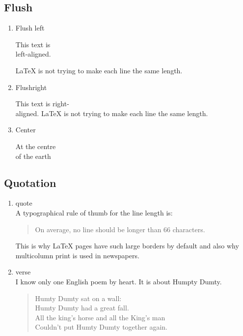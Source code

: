 \documentclass[12pt]{article}
\begin{document}
\subsection{Flush}
\begin{enumerate}
\item Flush left
  \begin{flushleft}
    This text is\\ left-aligned.

    \LaTeX{} is not trying to make each line the same length.
  \end{flushleft}
\item Flushright
  \begin{flushright}
    This text is right-\\aligned.
    \LaTeX{} is not trying to make each line the same length.
  \end{flushright}
\item{Center}
  \begin{center}
    At the centre\\of the earth
  \end{center}
\end{enumerate}
\subsection{Quotation}
\begin{enumerate}
\item quote\\
  A typographical rule of thumb for the line length is:
  \begin{quote}
    On average, no line should be longer than 66 characters.
  \end{quote}
  This is why \LaTeX{} pages have such large borders by default and also why multicolumn print is used in newspapers.
\item verse\\
  I know only one English poem by heart. It is about Humpty Dumty.
  \begin{flushleft}
    \begin{verse}
      Humty Dumty sat on a wall:\\
      Humty Dumty had a great fall.\\
      All the king's horse and all the King's man\\
      Couldn't put Humty Dumty together again.
    \end{verse}
  \end{flushleft}
\end{enumerate}
\end{document}
